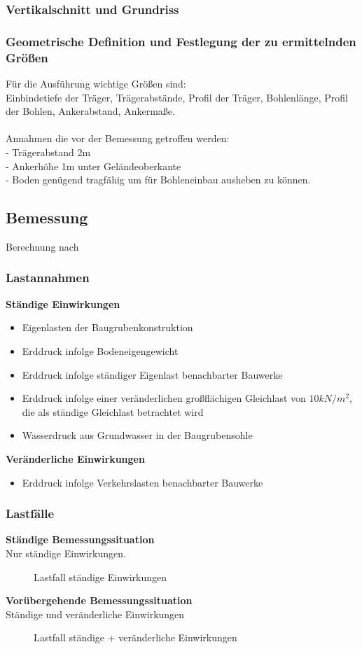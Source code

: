 \documentclass[11pt,fleqn,a4paper,halfparskip]{article}
\begin{document}
\subsubsection{Vertikalschnitt und Grundriss}
\subsubsection{Geometrische Definition und Festlegung der zu ermittelnden Größen}
Für die Ausführung wichtige Größen sind:\\
 Einbindetiefe der Träger, Trägerabstände, Profil der Träger, Bohlenlänge, Profil der Bohlen, Ankerabstand, Ankermaße. \\
\\
Annahmen die vor der Bemessung getroffen werden: \\
- Trägerabstand 2m\\
- Ankerhöhe 1m unter Geländeoberkante\\
- Boden genügend tragfähig um für Bohleneinbau ausheben zu können.
\newpage
\subsection{Bemessung}
Berechnung nach \cite[S.137ff]{wsp}
\subsubsection{Lastannahmen}
\textbf{Ständige Einwirkungen}
\begin{itemize}
\item Eigenlasten der Baugrubenkonstruktion
\item Erddruck infolge Bodeneigengewicht
\item Erddruck infolge ständiger Eigenlast benachbarter Bauwerke
\item Erddruck infolge einer veränderlichen großflächigen Gleichlast von $10kN/m^2$, die als ständige Gleichlast betrachtet wird
\item Wasserdruck aus Grundwasser in der Baugrubensohle
\end{itemize}
\textbf{Veränderliche Einwirkungen}
\begin{itemize}
\item Erddruck infolge Verkehrslasten benachbarter Bauwerke
\end{itemize}
\subsubsection{Lastfälle}
\textbf{Ständige Bemessungssituation}\\
Nur ständige Einwirkungen.\\
\begin{figure}[h]
\vspace{10cm}
\caption[Lastfall 1 - Aufgabe 2]{Lastfall ständige Einwirkungen \cite{me}}
\end{figure}
\newpage
\textbf{Vorübergehende Bemessungssituation}\\
Ständige und veränderliche Einwirkungen\\
\begin{figure}[h]
\vspace{8cm}
\caption[Lastfall 2 - Aufgabe 2]{Lastfall ständige + veränderliche Einwirkungen \cite{me}}
\end{figure}
\end{document}
